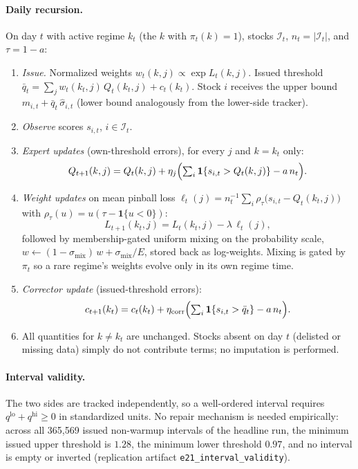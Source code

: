 \paragraph{Daily recursion.} On day $t$ with active regime $k_t$
(the $k$ with $\pi_t(k) = 1$), stocks $\mathcal{I}_t$, $n_t =
|\mathcal{I}_t|$, and $\tau = 1 - a$:
\begin{enumerate}
\item \emph{Issue.} Normalized weights $w_t(k, j) \propto \exp L_t(k,
j)$. Issued threshold $\bar q_t = \sum_j w_t(k_t, j)\, Q_t(k_t, j) +
c_t(k_t)$. Stock $i$ receives the upper bound $m_{i,t} + \bar
q_t\,\hat\sigma_{i,t}$ (lower bound analogously from the lower-side
tracker).
\item \emph{Observe} scores $s_{i,t}$, $i \in \mathcal{I}_t$.
\item \emph{Expert updates} (own-threshold errors), for every $j$ and
$k = k_t$ only:
\[
  Q_{t+1}(k, j) = Q_t(k, j) + \eta_j \Bigl( \textstyle\sum_{i}
  \mathbf{1}\{ s_{i,t} > Q_t(k, j) \} - a\, n_t \Bigr).
\]
\item \emph{Weight updates} on mean pinball loss
$\ell_t(j) = n_t^{-1} \sum_i \rho_\tau\bigl( s_{i,t} - Q_t(k_t, j)
\bigr)$ with $\rho_\tau(u) = u(\tau - \mathbf{1}\{u < 0\})$:
\[
  L_{t+1}(k_t, j) = L_t(k_t, j) - \lambda\, \ell_t(j),
\]
followed by membership-gated uniform mixing on the probability scale,
$w \leftarrow (1 - \sigma_{\mathrm{mix}})\, w +
\sigma_{\mathrm{mix}} / E$, stored back as log-weights. Mixing is gated
by $\pi_t$ so a rare regime's weights evolve only in its own regime
time.
\item \emph{Corrector update} (issued-threshold errors):
\[
  c_{t+1}(k_t) = c_t(k_t) + \eta_{\mathrm{corr}} \Bigl(
  \textstyle\sum_i \mathbf{1}\{ s_{i,t} > \bar q_t \} - a\, n_t \Bigr).
\]
\item All quantities for $k \ne k_t$ are unchanged. Stocks absent on
day $t$ (delisted or missing data) simply do not contribute terms; no
imputation is performed.
\end{enumerate}

\paragraph{Interval validity.} The two sides are tracked
independently, so a well-ordered interval requires
$q^{\mathrm{lo}} + q^{\mathrm{hi}} \ge 0$ in standardized units. No
repair mechanism is needed empirically: across all 365{,}569 issued
non-warmup intervals of the headline run, the minimum issued upper
threshold is $1.28$, the minimum lower threshold $0.97$, and no
interval is empty or inverted (replication artifact
\texttt{e21\_interval\_validity}).


